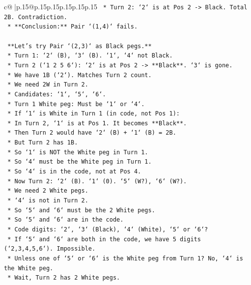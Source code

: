 \documentclass{article}
\begin{document}
{\begin{supertabular}{c@{$\;$}|p{.15\linewidth}@{}p{.15\linewidth}p{.15\linewidth}p{.15\linewidth}p{.15\linewidth}p{.15\linewidth}}
{{{\texttt{            *   Turn 2: `2` is at Pos 2 {-}> Black. Total 2B. Contradiction.} \\
\texttt{    *   **Conclusion:** Pair `(1,4)` fails.} \\
\\ 
\texttt{    **Let's try Pair `(2,3)` as Black pegs.**} \\
\texttt{    *   Turn 1: `2` (B), `3` (B). `1`, `4` not Black.} \\
\texttt{    *   Turn 2 (`1 2 5 6`): `2` is at Pos 2 {-}> **Black**. `3` is gone.} \\
\texttt{    *   We have 1B (`2`). Matches Turn 2 count.} \\
\texttt{    *   We need 2W in Turn 2.} \\
\texttt{    *   Candidates: `1`, `5`, `6`.} \\
\texttt{    *   Turn 1 White peg: Must be `1` or `4`.} \\
\texttt{    *   If `1` is White in Turn 1 (in code, not Pos 1):} \\
\texttt{        *   In Turn 2, `1` is at Pos 1. It becomes **Black**.} \\
\texttt{        *   Then Turn 2 would have `2` (B) + `1` (B) = 2B.} \\
\texttt{        *   But Turn 2 has 1B.} \\
\texttt{        *   So `1` is NOT the White peg in Turn 1.} \\
\texttt{    *   So `4` must be the White peg in Turn 1.} \\
\texttt{    *   So `4` is in the code, not at Pos 4.} \\
\texttt{    *   Now Turn 2: `2` (B). `1` (0). `5` (W?), `6` (W?).} \\
\texttt{    *   We need 2 White pegs.} \\
\texttt{    *   `4` is not in Turn 2.} \\
\texttt{    *   So `5` and `6` must be the 2 White pegs.} \\
\texttt{    *   So `5` and `6` are in the code.} \\
\texttt{    *   Code digits: `2`, `3` (Black), `4` (White), `5` or `6`?} \\
\texttt{    *   If `5` and `6` are both in the code, we have 5 digits (`2,3,4,5,6`). Impossible.} \\
\texttt{    *   Unless one of `5` or `6` is the White peg from Turn 1? No, `4` is the White peg.} \\
\texttt{    *   Wait, Turn 2 has 2 White pegs.} \\
}}}
\end{supertabular}}
\end{document}
